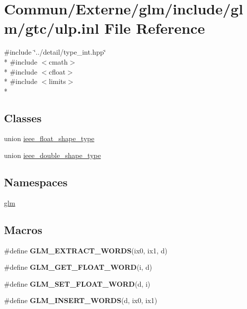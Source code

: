 \hypertarget{ulp_8inl}{}\section{Commun/\+Externe/glm/include/glm/gtc/ulp.inl File Reference}
\label{ulp_8inl}
{\ttfamily \#include \char`\"{}../detail/type\+\_\+int.\+hpp\char`\"{}}\\*
{\ttfamily \#include $<$cmath$>$}\\*
{\ttfamily \#include $<$cfloat$>$}\\*
{\ttfamily \#include $<$limits$>$}\\*
\subsection*{Classes}
\begin{DoxyCompactItemize}
\item 
union \hyperlink{unionieee__float__shape__type}{ieee\+\_\+float\+\_\+shape\+\_\+type}
\item 
union \hyperlink{unionieee__double__shape__type}{ieee\+\_\+double\+\_\+shape\+\_\+type}
\end{DoxyCompactItemize}
\subsection*{Namespaces}
\begin{DoxyCompactItemize}
\item 
 \hyperlink{namespaceglm}{glm}
\end{DoxyCompactItemize}
\subsection*{Macros}
\begin{DoxyCompactItemize}
\item 
\#define {\bfseries G\+L\+M\+\_\+\+E\+X\+T\+R\+A\+C\+T\+\_\+\+W\+O\+R\+DS}(ix0,  ix1,  d)
\item 
\#define {\bfseries G\+L\+M\+\_\+\+G\+E\+T\+\_\+\+F\+L\+O\+A\+T\+\_\+\+W\+O\+RD}(i,  d)
\item 
\#define {\bfseries G\+L\+M\+\_\+\+S\+E\+T\+\_\+\+F\+L\+O\+A\+T\+\_\+\+W\+O\+RD}(d,  i)
\item 
\#define {\bfseries G\+L\+M\+\_\+\+I\+N\+S\+E\+R\+T\+\_\+\+W\+O\+R\+DS}(d,  ix0,  ix1)
\end{DoxyCompactItemize}
